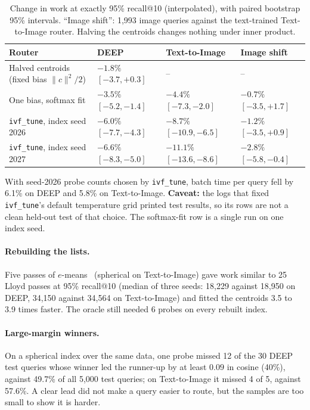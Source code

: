 \documentclass[11pt]{article}
\theoremstyle{definition}
\theoremstyle{remark}
\begin{document}
\begin{table}[t]
\centering
\caption{Change in work at exactly 95\% recall@10 (interpolated), with paired bootstrap 95\% intervals. ``Image shift'': 1,993 image queries against the text-trained Text-to-Image router. Halving the centroids changes nothing under inner product.}\label{tab:routers}
\small
\begin{tabular}{llll}
\toprule
Router & DEEP & Text-to-Image & Image shift\\
\midrule
Halved centroids (fixed bias $\|c\|^2/2$) & $-1.8\%$ $[-3.7,+0.3]$ & -- & --\\
One bias, softmax fit & $-3.5\%$ $[-5.2,-1.4]$ & $-4.4\%$ $[-7.3,-2.0]$ & $-0.7\%$ $[-3.5,+1.7]$\\
\texttt{ivf\_tune}, index seed 2026 & $-6.0\%$ $[-7.7,-4.3]$ & $-8.7\%$ $[-10.9,-6.5]$ & $-1.2\%$ $[-3.5,+0.9]$\\
\texttt{ivf\_tune}, index seed 2027 & $-6.6\%$ $[-8.3,-5.0]$ & $-11.1\%$ $[-13.6,-8.6]$ & $-2.8\%$ $[-5.8,-0.4]$\\
\bottomrule
\end{tabular}
\end{table}

With seed-2026 probe counts chosen by \texttt{ivf\_tune}, batch time per query fell by 6.1\% on DEEP and 5.8\% on Text-to-Image. \textbf{Caveat:} the logs that fixed \texttt{ivf\_tune}'s default temperature grid printed test results, so its rows are not a clean held-out test of that choice. The softmax-fit row is a single run on one index seed.

\paragraph{Rebuilding the lists.} Five passes of $e$-means~\cite{bessa2026emeans} (spherical on Text-to-Image) gave work similar to 25 Lloyd passes at 95\% recall@10 (median of three seeds: 18,229 against 18,950 on DEEP, 34,150 against 34,564 on Text-to-Image) and fitted the centroids 3.5 to 3.9 times faster. The oracle still needed 6 probes on every rebuilt index.

\paragraph{Large-margin winners.} On a spherical index over the same data, one probe missed 12 of the 30 DEEP test queries whose winner led the runner-up by at least $0.09$ in cosine (40\%), against 49.7\% of all 5,000 test queries; on Text-to-Image it missed 4 of 5, against 57.6\%. A clear lead did not make a query easier to route, but the samples are too small to show it is harder.
\end{document}
